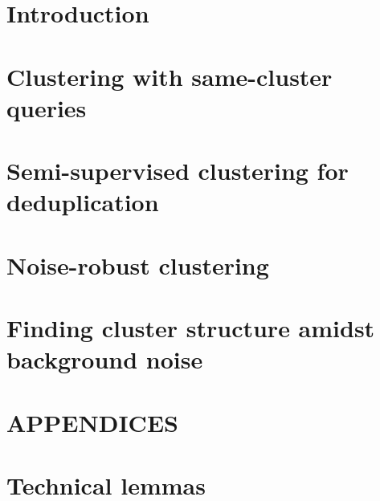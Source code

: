 \documentclass[letterpaper,12pt,titlepage,oneside,final]{book}
\let\origdoublepage\cleardoublepage
\newcommand{\clearemptydoublepage}{%
  \clearpage{\pagestyle{empty}\origdoublepage}}
\let\cleardoublepage\clearemptydoublepage
\begin{document}
 

\chapter{Introduction}
\label{chapter:introduction}


\chapter{Clustering with same-cluster queries}
\label{chapter:activeClustering}

\begin{subappendices}

\end{subappendices}

\chapter{Semi-supervised clustering for deduplication}
\label{chapter:deduplication}


\begin{subappendices}

\end{subappendices}

\chapter{Noise-robust clustering}
\label{chapter:optimizationClustering}

\begin{subappendices}

\end{subappendices}

\chapter{Finding cluster structure amidst background noise}
\label{chapter:clusteringNoise}

\begin{subappendices}

\end{subappendices}

\cleardoublepage 
{}  

\renewcommand*{\bibname}{References}




\appendix
\chapter*{APPENDICES}
\chapter[Technical lemmas]{Technical lemmas}
\label{appendix:technicalLemmas}

\end{document}

